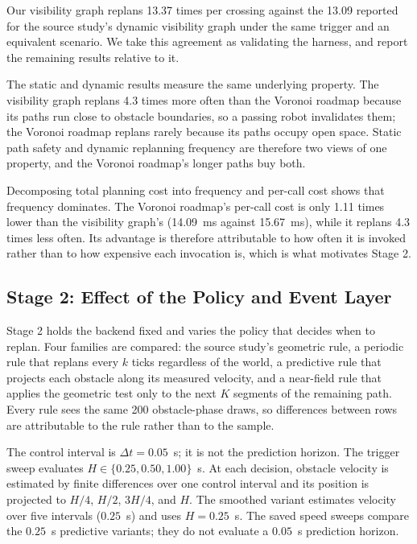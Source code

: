 Our visibility graph replans 13.37 times per crossing against the 13.09
reported for the source study's dynamic visibility graph under the same trigger
and an equivalent scenario. We take this agreement as validating the harness,
and report the remaining results relative to it.

The static and dynamic results measure the same underlying property. The
visibility graph replans 4.3 times more often than the Voronoi roadmap because
its paths run close to obstacle boundaries, so a passing robot invalidates
them; the Voronoi roadmap replans rarely because its paths occupy open space.
Static path safety and dynamic replanning frequency are therefore two views of
one property, and the Voronoi roadmap's longer paths buy both.

Decomposing total planning cost into frequency and per-call cost shows that
frequency dominates. The Voronoi roadmap's per-call cost is only 1.11 times
lower than the visibility graph's (14.09~ms against 15.67~ms), while it replans
4.3 times less often. Its advantage is therefore attributable to how often it
is invoked rather than to how expensive each invocation is, which is what
motivates Stage 2.

\subsection{Stage 2: Effect of the Policy and Event Layer}
\label{sec:stage2}

Stage 2 holds the backend fixed and varies the policy that decides when to
replan. Four families are compared: the source study's geometric rule, a
periodic rule that replans every $k$ ticks regardless of the world, a
predictive rule that projects each obstacle along its measured velocity, and a
near-field rule that applies the geometric test only to the next $K$ segments
of the remaining path. Every rule sees the same 200 obstacle-phase draws, so
differences between rows are attributable to the rule rather than to the
sample.

The control interval is $\Delta t=0.05$~s; it is not the prediction horizon.
The trigger sweep evaluates $H\in\{0.25,0.50,1.00\}$~s. At each decision,
obstacle velocity is estimated by finite differences over one control interval
and its position is projected to $H/4$, $H/2$, $3H/4$, and $H$.
The smoothed variant estimates velocity over five intervals ($0.25$~s) and
uses $H=0.25$~s. The saved speed sweeps compare the $0.25$~s predictive
variants; they do not evaluate a $0.05$~s prediction horizon.

